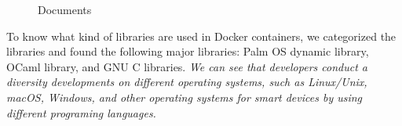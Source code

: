 \begin{figure}
	\centering
	\caption{Documents}
	\label{fig:type-doc}
\end{figure} 


 
 
To know what kind of libraries are used in Docker containers, we categorized the libraries and found the following major libraries: Palm OS dynamic library, OCaml library, and GNU C libraries. 
\textit{We can see that developers conduct a diversity developments on different operating systems, such as Linux/Unix, macOS, Windows, and other operating systems for smart devices by using different programing languages.} 
